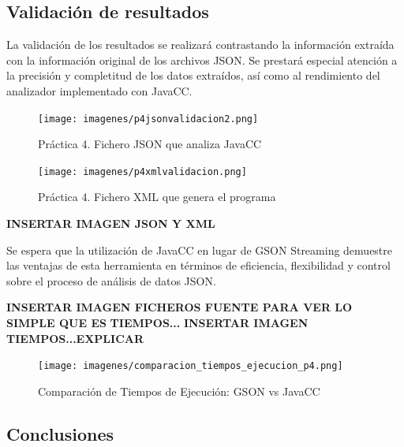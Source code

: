 \subsection{Validación de resultados}

La validación de los resultados se realizará contrastando la información extraída con la información original de los archivos JSON. Se prestará especial atención a la precisión y completitud de los datos extraídos, así como al rendimiento del analizador implementado con JavaCC.

\begin{figure}[H]
	\centering
	\texttt{[image: imagenes/p4jsonvalidacion2.png]}
	\caption{\label{fig:p4jsonvalidacion2}Práctica 4. Fichero JSON que analiza JavaCC}
\end{figure}

\begin{figure}[H]
	\centering
	\texttt{[image: imagenes/p4xmlvalidacion.png]}
	\caption{\label{fig:p4xmlvalidacion2}Práctica 4. Fichero XML que genera el programa}
\end{figure}


\textbf{INSERTAR IMAGEN JSON Y XML}

Se espera que la utilización de JavaCC en lugar de GSON Streaming demuestre las ventajas de esta herramienta en términos de eficiencia, flexibilidad y control sobre el proceso de análisis de datos JSON.

\textbf{INSERTAR IMAGEN FICHEROS FUENTE PARA VER LO SIMPLE QUE ES
}
\textbf{TIEMPOS...}
\textbf{INSERTAR IMAGEN TIEMPOS...EXPLICAR}

\begin{figure}[H]
	\centering
	\texttt{[image: imagenes/comparacion\_tiempos\_ejecucion\_p4.png]}
	\caption{\label{fig:comparacion_tiempos_ejecucion_p4}Comparación de Tiempos de Ejecución: GSON vs JavaCC}
\end{figure}


\subsection{Conclusiones}


